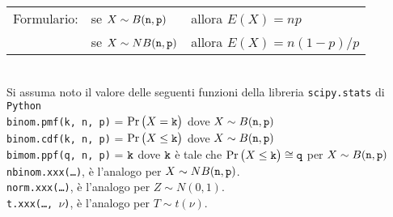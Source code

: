 \documentclass[11pt,twoside,a4paper]{article}
\begin{document}
\vfill\hrulefill\par
\begin{tabular}{@{}lll}
Formulario:& se $X\sim B({\tt n},{\tt p})$ & allora $E(X)=np$\\
           & se $X\sim NB({\tt n},{\tt p})$& allora $E(X)=n(1-p)/p$\\
\end{tabular}
\\[1ex]
Si assuma noto il valore delle seguenti funzioni della libreria {\tt scipy.stats\/} di  {\tt Python\/}\\
{\tt binom.pmf(k, n, p)} = $\Pr\big(X={\tt k}\big)$ dove $X\sim B({\tt n},{\tt p})$\\
{\tt binom.cdf(k, n, p)} = $\Pr\big(X\le{\tt k}\big)$ dove  $X\sim B({\tt n},{\tt p})$ \\
{\tt bimom.ppf(q, n, p)} = ${\tt k}$ dove ${\tt k}$ è tale che 
                           $\Pr\big(X\le{\tt k}\big)\cong{\tt q}$ per $X\sim B({\tt n},{\tt p})$\\
{\tt nbinom.xxx(\ldots)}, è l'analogo per $X\sim NB({\tt n},{\tt p})$.\\
{\tt norm.xxx(\ldots)}, è l'analogo per $Z\sim N(0,1)$.\\
\hfill{\tt t.xxx(\ldots, $\nu$)}, è l'analogo per $T\sim t(\nu)$.
\end{document}
